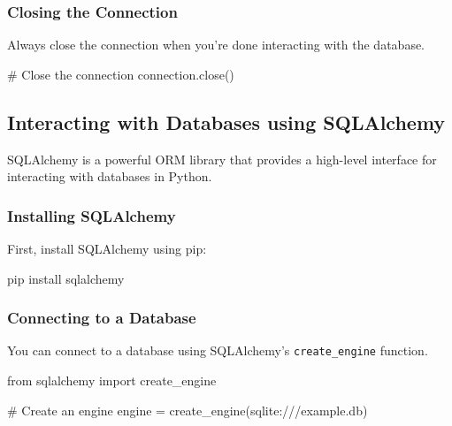 \documentclass[
  letterpaper,
  DIV=11,
  numbers=noendperiod]{scrreprt}
\newenvironment{Shaded}{\begin{snugshade}}{\end{snugshade}}
\newcommand{\CommentTok}[1]{\textcolor[rgb]{0.37,0.37,0.37}{#1}}
\newcommand{\ExtensionTok}[1]{\textcolor[rgb]{0.00,0.23,0.31}{#1}}
\newcommand{\ImportTok}[1]{\textcolor[rgb]{0.00,0.46,0.62}{#1}}
\newcommand{\NormalTok}[1]{\textcolor[rgb]{0.00,0.23,0.31}{#1}}
\newcommand{\OperatorTok}[1]{\textcolor[rgb]{0.37,0.37,0.37}{#1}}
\newcommand{\StringTok}[1]{\textcolor[rgb]{0.13,0.47,0.30}{#1}}
\begin{document}
\subsubsection{Closing the Connection}\label{closing-the-connection}

Always close the connection when you're done interacting with the
database.

\begin{Shaded}
\begin{Highlighting}[]
\CommentTok{\# Close the connection}
\NormalTok{connection.close()}
\end{Highlighting}
\end{Shaded}

\subsection{Interacting with Databases using
SQLAlchemy}\label{interacting-with-databases-using-sqlalchemy}

SQLAlchemy is a powerful ORM library that provides a high-level
interface for interacting with databases in Python.

\subsubsection{Installing SQLAlchemy}\label{installing-sqlalchemy}

First, install SQLAlchemy using pip:

\begin{Shaded}
\begin{Highlighting}[]
\ExtensionTok{pip}\NormalTok{ install sqlalchemy}
\end{Highlighting}
\end{Shaded}

\subsubsection{Connecting to a
Database}\label{connecting-to-a-database-1}

You can connect to a database using SQLAlchemy's \texttt{create\_engine}
function.

\begin{Shaded}
\begin{Highlighting}[]
\ImportTok{from}\NormalTok{ sqlalchemy }\ImportTok{import}\NormalTok{ create\_engine}

\CommentTok{\# Create an engine}
\NormalTok{engine }\OperatorTok{=}\NormalTok{ create\_engine(}\StringTok{\textquotesingle{}sqlite:///example.db\textquotesingle{}}\NormalTok{)}
\end{Highlighting}
\end{Shaded}
\end{document}
